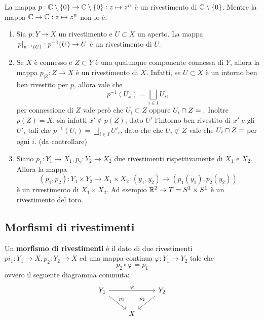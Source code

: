 \documentclass[]{article}
\begin{document}
\begin{example}  \nl
    La mappa $p: \mathbb{C} \setminus \left\{ 0 \right\} \to \mathbb{C} \setminus \left\{ 0 \right\}: z \mapsto z^n$ \`e un rivestimento di $\mathbb{C} \setminus \left\{ 0 \right\}$.
    Mentre la mappa $\mathbb{C} \to \mathbb{C}: z \mapsto z^n$ non lo \`e.
\end{example}

\begin{proposition}  \nl
    \begin{enumerate}
        \item Sia $p: Y \to X$ un rivestimento e $U \subset X$ un aperto. \nl
        La mappa $\left. p \right|_{p^{-1}(U)}: p^{-1}(U) \to U$ \`e un rivestimento di $U$.
        \item Se $X$ \`e connesso e $Z \subset Y$ \`e una qualunque componente connessa di $Y$, allora 
        la mappa $p_{\big| Z}: Z \to X$ \`e un rivestimento di $X$. \nl
        Infatti, se $U \subset X$ \`e un intorno ben ben rivestito per $p$, allora vale che
        \[
            p^{-1}(U_x) = \bigsqcup_{i \in I} U_i,
        \]
        per connessione di $Z$ vale per\`o che $U_i \subset Z$ oppure $U_i \cap Z = \empty.$ \nl
        Inoltre $p(Z) = X$, sia infatti $x' \not\in p(Z)$, dato $U'$ l'intorno ben rivestito di $x'$ e
        gli $U'_i$ tali che $p^{-1}(U_i) = \bigsqcup_{i \in I} U'_i$, dato che che $U_i \not\subset Z$ vale che
        $U_i \cap Z = \empty $ per ogni $i$. (da controllare)
        \item Siano $p_1: Y_1 \to X_1, p_2: Y_2 \to X_2$ due rivestimenti rispettivamente di $X_1$ e $X_2$. Allora la mappa
        \[  
            \left(p_1, p_2\right): Y_1 \times Y_2 \to X_1 \times X_2: (y_1, y_2) \to (p_1(y_1), p_2(y_2))
        \]
        \`e un rivestimento di $X_1 \times X_2$. \nl
        Ad esempio $\mathbb{R}^2 \to T = S^{1} \times S^{1}$ \`e un rivestimento del toro.

    \end{enumerate}
\end{proposition}

\subsection{Morfismi di rivestimenti}

\begin{definition}  \nl
    Un \textbf{morfismo di rivestimenti} \`e il dato di due rivestimenti $pi_1: Y_1 \to X, p_2: Y_2 \to X$
    ed una mappa continua $\varphi: Y_1 \to Y_2$ tale che
    \[
        p_2 \circ \varphi = p_1
    \]
    ovvero il seguente diagramma commuta:
    \[\begin{tikzcd}
	{Y_1} && {Y_2} \\
	& X
	\arrow["\varphi", from=1-1, to=1-3]
	\arrow["{p_1}", from=1-1, to=2-2]
	\arrow["{p_2}"', from=1-3, to=2-2]
    \end{tikzcd}\]
\end{definition}
\end{document}

